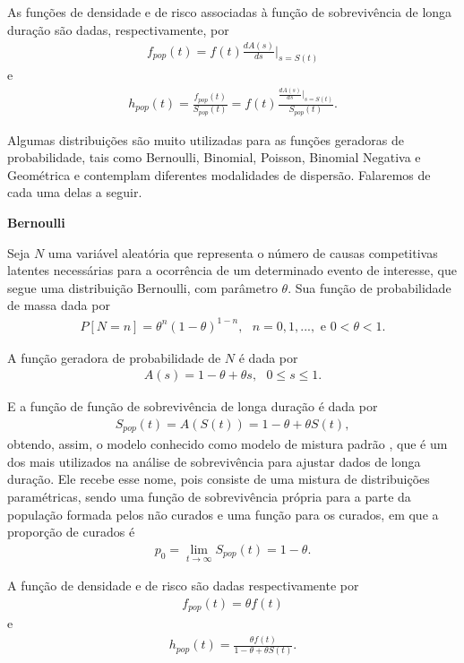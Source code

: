 As funções de densidade e de risco associadas à função de sobrevivência de longa duração são dadas, respectivamente, por
\begin{eqnarray}
f_{pop}(t) = f(t)\frac{dA(s)}{ds}|_{s=S(t)}
\end{eqnarray}
e
\begin{eqnarray}
h_{pop}(t) = \frac{f_{pop}(t)}{S_{pop}(t)}=f(t)\frac{\frac{dA(s)}{ds}|_{s=S(t)}}{S_{pop}(t)}.
\end{eqnarray}

Algumas distribuições são muito utilizadas para as funções geradoras de probabilidade, tais como Bernoulli, Binomial, Poisson, Binomial Negativa e Geométrica e contemplam diferentes modalidades de dispersão. Falaremos de cada uma delas a seguir.

\textbf{Bernoulli}

Seja $N$ uma variável aleatória que representa o número de causas competitivas latentes necessárias para a ocorrência de um determinado evento de interesse, que segue uma distribuição Bernoulli, com parâmetro $\theta$. Sua função de probabilidade de massa dada por
\begin{eqnarray}
P[N=n]=\theta^n(1-\theta)^{1-n},\text{ }n=0,1,..., \text{ e }0<\theta<1.
\end{eqnarray}

A função geradora de probabilidade de $N$ é dada por
\begin{eqnarray}
A(s) = 1 - \theta + \theta s, \text{ }0 \leq s \leq 1.
\end{eqnarray}

E a função de função de sobrevivência de longa duração é dada por
\begin{eqnarray}
S_{pop}(t) = A(S(t)) = 1 - \theta + \theta S(t),
\end{eqnarray}
obtendo, assim, o modelo conhecido como modelo de mistura padrão \cite{berkson1952survival}, que é um dos mais utilizados na análise de sobrevivência para ajustar dados de longa duração. Ele recebe esse nome, pois consiste de uma mistura de distribuições paramétricas, sendo uma função de sobrevivência própria para a parte da população formada pelos não curados e uma função para os curados, em que a proporção de curados é
\begin{align}\label{p0}
	 p_{0} = \lim_{t\rightarrow \infty}{S_{pop}(t)} = 1-\theta.
\end{align}

A função de densidade e de risco são dadas respectivamente por
\begin{eqnarray}
f_{pop}(t) = \theta f(t)
\end{eqnarray}
e
\begin{eqnarray}
h_{pop}(t) = \frac{\theta f(t)}{1 - \theta + \theta S(t)}.
\end{eqnarray}


